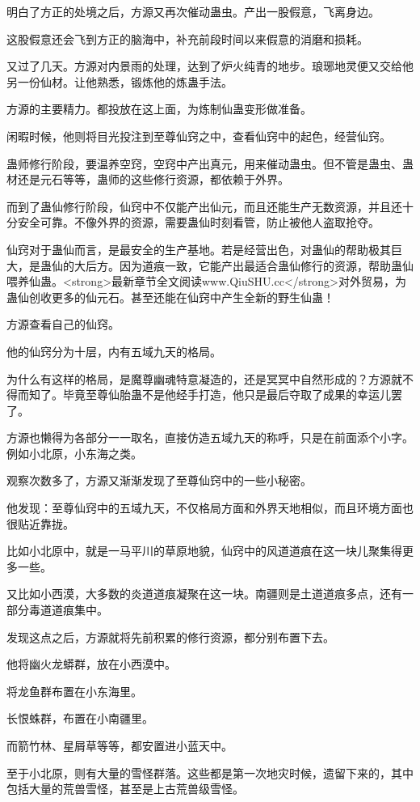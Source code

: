 \begin{this_body}
明白了方正的处境之后，方源又再次催动蛊虫。产出一股假意，飞离身边。

这股假意还会飞到方正的脑海中，补充前段时间以来假意的消磨和损耗。

又过了几天。方源对内景雨的处理，达到了炉火纯青的地步。琅琊地灵便又交给他另一份仙材。让他熟悉，锻炼他的炼蛊手法。

方源的主要精力。都投放在这上面，为炼制仙蛊变形做准备。

闲暇时候，他则将目光投注到至尊仙窍之中，查看仙窍中的起色，经营仙窍。

蛊师修行阶段，要温养空窍，空窍中产出真元，用来催动蛊虫。但不管是蛊虫、蛊材还是元石等等，蛊师的这些修行资源，都依赖于外界。

而到了蛊仙修行阶段，仙窍中不仅能产出仙元，而且还能生产无数资源，并且还十分安全可靠。不像外界的资源，需要蛊仙时刻看管，防止被他人盗取抢夺。

仙窍对于蛊仙而言，是最安全的生产基地。若是经营出色，对蛊仙的帮助极其巨大，是蛊仙的大后方。因为道痕一致，它能产出最适合蛊仙修行的资源，帮助蛊仙喂养仙蛊。<strong>最新章节全文阅读www.QiuSHU.cc</strong>对外贸易，为蛊仙创收更多的仙元石。甚至还能在仙窍中产生全新的野生仙蛊！

方源查看自己的仙窍。

他的仙窍分为十层，内有五域九天的格局。

为什么有这样的格局，是魔尊幽魂特意凝造的，还是冥冥中自然形成的？方源就不得而知了。毕竟至尊仙胎蛊不是他经手打造，他只是最后夺取了成果的幸运儿罢了。

方源也懒得为各部分一一取名，直接仿造五域九天的称呼，只是在前面添个小字。例如小北原，小东海之类。

观察次数多了，方源又渐渐发现了至尊仙窍中的一些小秘密。

他发现：至尊仙窍中的五域九天，不仅格局方面和外界天地相似，而且环境方面也很贴近靠拢。

比如小北原中，就是一马平川的草原地貌，仙窍中的风道道痕在这一块儿聚集得更多一些。

又比如小西漠，大多数的炎道道痕凝聚在这一块。南疆则是土道道痕多点，还有一部分毒道道痕集中。

发现这点之后，方源就将先前积累的修行资源，都分别布置下去。

他将幽火龙蟒群，放在小西漠中。

将龙鱼群布置在小东海里。

长恨蛛群，布置在小南疆里。

而箭竹林、星屑草等等，都安置进小蓝天中。

至于小北原，则有大量的雪怪群落。这些都是第一次地灾时候，遗留下来的，其中包括大量的荒兽雪怪，甚至是上古荒兽级雪怪。


\end{this_body}
